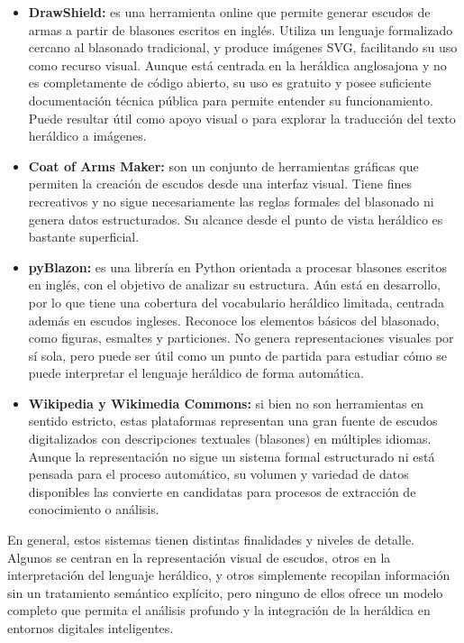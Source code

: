 \begin{itemize}
    \item \textbf{DrawShield:} es una herramienta online que permite generar escudos de armas
    a partir de blasones escritos en inglés. Utiliza un lenguaje formalizado cercano al blasonado
    tradicional, y produce imágenes SVG, facilitando su uso como recurso visual. Aunque está 
    centrada en la heráldica anglosajona y no es completamente de código abierto, su 
    uso es gratuito y posee suficiente documentación técnica pública para permite entender su 
    funcionamiento. Puede resultar útil como apoyo visual o para explorar la traducción del
    texto heráldico a imágenes.
    \item \textbf{Coat of Arms Maker:} son un conjunto de herramientas gráficas que permiten
    la creación de escudos desde una interfaz visual. Tiene fines recreativos y no sigue
    necesariamente las reglas formales del blasonado ni genera datos estructurados. Su alcance
    desde el punto de vista heráldico es bastante superficial.
    \item \textbf{pyBlazon:} es una librería en Python orientada a procesar blasones escritos en
    inglés, con el objetivo de analizar su estructura. Aún está en desarrollo, por lo que tiene
    una cobertura del vocabulario heráldico limitada, centrada además en escudos ingleses.
    Reconoce los elementos básicos del blasonado, como figuras, esmaltes y particiones.
    No genera representaciones visuales por sí sola, pero puede ser útil como un punto de partida
    para estudiar cómo se puede interpretar el lenguaje heráldico de forma automática.
    \item \textbf{Wikipedia y Wikimedia Commons:} si bien no son herramientas en sentido estricto,
    estas plataformas representan una gran fuente de escudos digitalizados con descripciones
    textuales (blasones) en múltiples idiomas. Aunque la representación no sigue un sistema formal 
    estructurado ni está pensada para el proceso automático, su volumen y variedad de datos
    disponibles las convierte en candidatas para procesos de extracción de conocimiento o análisis.
\end{itemize}

En general, estos sistemas tienen distintas finalidades y niveles de detalle. Algunos se centran
en la representación visual de escudos, otros en la interpretación del lenguaje heráldico, y
otros simplemente recopilan información sin un tratamiento semántico explícito, pero ninguno
de ellos ofrece un modelo completo que permita el análisis profundo y la integración de la 
heráldica en entornos digitales inteligentes.

